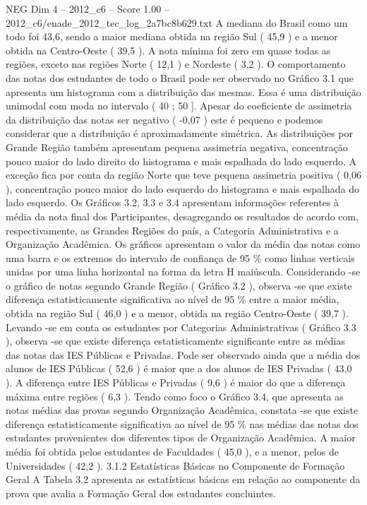 \begin{textsample}{NEG Dim 4 – 2012\_c6 – Score 1.00 – 2012\_c6/enade\_2012\_tec\_log\_2a7bc8b629.txt}
A mediana do Brasil como um todo foi 43,6, sendo a maior mediana obtida na região Sul ( 45,9 ) e a menor obtida na Centro-Oeste ( 39,5 ).
A nota mínima foi zero em quase todas as regiões, exceto nas regiões Norte ( 12,1 ) e Nordeste ( 3,2 ).
O comportamento das notas dos estudantes de todo o Brasil pode ser observado no Gráfico 3.1 que apresenta um histograma com a distribuição das mesmas.
Essa é uma distribuição unimodal com moda no intervalo ( 40 ; 50 ].
Apesar do coeficiente de assimetria da distribuição das notas ser negativo ( -0,07 ) este é pequeno e podemos considerar que a distribuição é aproximadamente simétrica.
As distribuições por Grande Região também apresentam pequena assimetria negativa, concentração pouco maior do lado direito do histograma e mais espalhada do lado esquerdo.
A exceção fica por conta da região Norte que teve pequena assimetria positiva ( 0,06 ), concentração pouco maior do lado esquerdo do histograma e mais espalhada do lado esquerdo.
Os Gráficos 3.2, 3.3 e 3.4 apresentam informações referentes à média da nota final dos Participantes, desagregando os resultados de acordo com, respectivamente, as Grandes Regiões do país, a Categoria Administrativa e a Organização Acadêmica.
Os gráficos apresentam o valor da média das notas como uma barra e os extremos do intervalo de confiança de 95 \% como linhas verticais unidas por uma linha horizontal na forma da letra H maiúscula.
Considerando -se o gráfico de notas segundo Grande Região ( Gráfico 3.2 ), observa -se que existe diferença estatisticamente significativa ao nível de 95 \% entre a maior média, obtida na região Sul ( 46,0 ) e a menor, obtida na região Centro-Oeste ( 39,7 ).
Levando -se em conta os estudantes por Categorias Administrativas ( Gráfico 3.3 ), observa -se que existe diferença estatisticamente significante entre as médias das notas das IES Públicas e Privadas.
Pode ser observado ainda que a média dos alunos de IES Públicas ( 52,6 ) é maior que a dos alunos de IES Privadas ( 43,0 ).
A diferença entre IES Públicas e Privadas ( 9,6 ) é maior do que a diferença máxima entre regiões ( 6,3 ).
Tendo como foco o Gráfico 3.4, que apresenta as notas médias das provas segundo Organização Acadêmica, constata -se que existe diferença estatisticamente significativa ao nível de 95 \% nas médias das notas dos estudantes provenientes dos diferentes tipos de Organização Acadêmica.
A maior média foi obtida pelos estudantes de Faculdades ( 45,0 ), e a menor, pelos de Universidades ( 42,2 ). 3.1.2 Estatísticas Básicas no Componente de Formação Geral A Tabela 3.2 apresenta as estatísticas básicas em relação ao componente da prova que avalia a Formação Geral dos estudantes concluintes.

\end{textsample}
